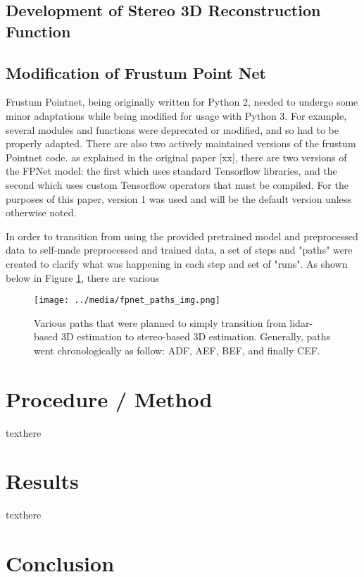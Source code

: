\subsection{Development of Stereo 3D Reconstruction Function}


\subsection{Modification of Frustum Point Net}

Frustum Pointnet, being originally written for Python 2, needed to undergo some minor adaptations while being modified for usage with Python 3. For example, several modules and functions were deprecated or modified, and so had to be properly adapted. There are also two actively maintained versions of the frustum Pointnet code. as explained in the original paper [xx], there are two versions of the FPNet model: the first which uses standard Tensorflow libraries, and the second which uses custom Tensorflow operators that must be compiled. For the purposes of this paper, version 1 was used and will be the default version unless otherwise noted. 

In order to transition from using the provided pretrained model and preprocessed data to self-made preprocessed and trained data, a set of steps and "paths" were created to clarify what was happening in each step and set of "runs". As shown below in Figure \ref{fp_paths}, there are various 

\begin{figure}[h] %
    \texttt{[image: ../media/fpnet\_paths\_img.png]}
    \caption{Various paths that were planned to simply transition from lidar-based 3D estimation to stereo-based 3D estimation. Generally, paths went chronologically as follow: ADF, AEF, BEF, and finally CEF.}
    \label{fp_paths} %
\end{figure}



\section{Procedure / Method}
texthere

\section{Results}
texthere

\section{Conclusion}

